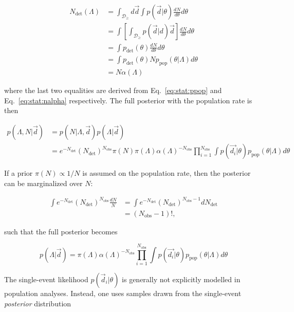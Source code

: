 \documentclass[%
preprint,
nofootinbib,
 amsmath,amssymb,
 aps,
]{revtex4-2}
\newcommand{\given}[2]{p( #1 | #2 )}
\newcommand{\ppop}[0]{p_{\text{pop}}}
\newcommand{\pdet}[0]{p_{\text{det}}}
\newcommand{\ndet}[0]{N_{\text{det}}}
\newcommand{\nobs}[0]{N_{\text{obs}}}
\begin{document}
\begin{align}
	\ndet(\Lambda) & = \int_{\mathcal{D}_\geq}  d\vec{d} \int \given{\vec{d}}{\theta} \frac{dN}{d\theta} d\theta      \\
	               & = \int \left[ \int_{\mathcal{D}_\geq} \given{\vec{d}} d\vec{d} \right]\frac{dN}{d\theta} d\theta \\
	               & = \int \pdet(\theta)\frac{dN}{d\theta} d\theta                                                   \\
	               & = \int \pdet(\theta) N \ppop(\theta | \Lambda) d\theta                                           \\
	               & = N \alpha(\Lambda)
\end{align}

where the last two equalities are derived from Eq.~\eqref{eq:stat:ppop} and
Eq.~\eqref{eq:stat:nalpha} respectively. The full posterior with the population rate is then

\begin{align}
	\nonumber
	\given{\Lambda, N }{\vec{d}} & = \given{N}{\Lambda, \vec{d}}\given{\Lambda}{\vec{d}}                    \\
	                             & = e^{-\ndet}(\ndet)^{\nobs} \pi(N) \pi(\Lambda) \alpha(\Lambda)^{-\nobs}
	\prod_{i=1}^{\nobs} \int \given{\vec{d_i}}{\theta} \ppop(\theta | \Lambda ) d\theta
\end{align}

If a prior $\pi(N) \propto 1/N$ is assumed on the population rate, then the posterior can be
marginalized over $N$:

\begin{align}
	\int e^{-\ndet}(\ndet)^{\nobs} \frac{dN}{N} & = \int e^{-\ndet}(\ndet)^{\nobs - 1} d\ndet \\
	                                            & = (\nobs - 1)!,
\end{align}

such that the full posterior becomes

\begin{equation}
	\label{eq:stat:full-hierarchical-posterior}
	\given{\Lambda}{\vec{d}} = \pi(\Lambda) \alpha(\Lambda)^{-\nobs}
	\prod_{i=1}^{\nobs} \int \given{\vec{d_i}}{\theta} \ppop(\theta | \Lambda ) d\theta
\end{equation}

The single-event likelihood $\given{\vec{d}_i}{\theta}$ is generally not explicitly modelled in
population analyses. Instead, one uses samples drawn from the single-event \textit{posterior}
distribution
\end{document}
